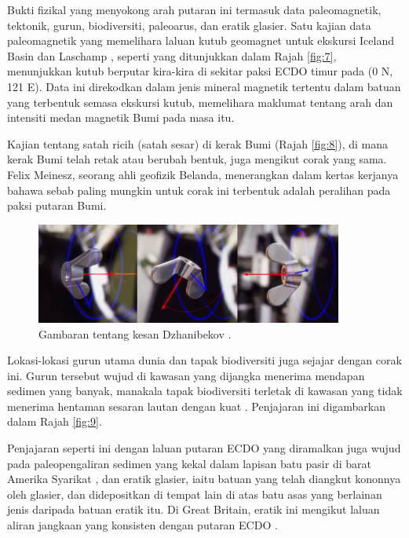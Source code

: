 \documentclass[10pt,twocolumn,letterpaper]{article}
\begin{document}
Bukti fizikal yang menyokong arah putaran ini termasuk data paleomagnetik, tektonik, gurun, biodiversiti, paleoarus, dan eratik glasier.
Satu kajian data paleomagnetik yang memelihara laluan kutub geomagnet untuk ekskursi Iceland Basin dan Laschamp \cite{35}, seperti yang ditunjukkan dalam Rajah \ref{fig:7}, menunjukkan kutub berputar kira-kira di sekitar paksi ECDO timur pada (0 N, 121 E). Data ini direkodkan dalam jenis mineral magnetik tertentu dalam batuan yang terbentuk semasa ekskursi kutub, memelihara maklumat tentang arah dan intensiti medan magnetik Bumi pada masa itu.

Kajian tentang satah ricih (satah sesar) di kerak Bumi (Rajah \ref{fig:8}), di mana kerak Bumi telah retak atau berubah bentuk, juga mengikut corak yang sama. Felix Meinesz, seorang ahli geofizik Belanda, menerangkan dalam kertas kerjanya \cite{36} bahawa sebab paling mungkin untuk corak ini terbentuk adalah peralihan pada paksi putaran Bumi.

\begin{figure}
\begin{center}
\includegraphics[width=0.9\textwidth]{dzhani.jpg}
\end{center}
   \caption{Gambaran tentang kesan Dzhanibekov \cite{28}.}
\label{fig:10}
\end{figure}

Lokasi-lokasi gurun utama dunia dan tapak biodiversiti juga sejajar dengan corak ini. Gurun tersebut wujud di kawasan yang dijangka menerima mendapan sedimen yang banyak, manakala tapak biodiversiti terletak di kawasan yang tidak menerima hentaman sesaran lautan dengan kuat \cite{28}. Penjajaran ini digambarkan dalam Rajah \ref{fig:9}.

Penjajaran seperti ini dengan laluan putaran ECDO yang diramalkan juga wujud pada paleopengaliran sedimen yang kekal dalam lapisan batu pasir di barat Amerika Syarikat \cite{21}, dan eratik glasier, iaitu batuan yang telah diangkut kononnya oleh glasier, dan didepositkan di tempat lain di atas batu asas yang berlainan jenis daripada batuan eratik itu. Di Great Britain, eratik ini mengikut laluan aliran jangkaan yang konsisten dengan putaran ECDO \cite{67,68}.
\end{document}
